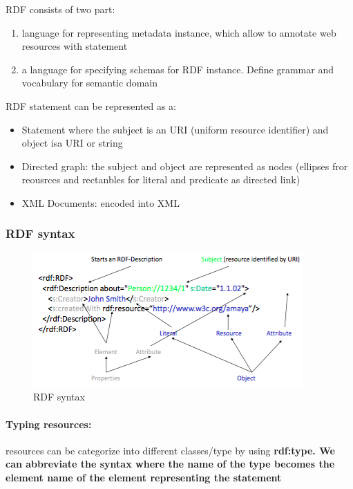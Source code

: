 RDF consists of two part:
\begin{enumerate}
\item language for representing metadata instance, which allow to annotate web resources with statement
\item a language for specifying schemas for RDF instance. Define grammar and vocabulary for semantic domain
\end{enumerate}

RDF statement can be represented as a:
\begin{itemize}
\item Statement where the subject is an URI (uniform resource identifier) and object isa URI or string
\item Directed graph: the subject and object are represented as nodes (ellipses fror reousrces and rectanbles for literal and predicate as directed link)
\item XML Documents: encoded into XML
\end{itemize}

\subsubsection{RDF syntax}
\begin{figure}[H]
\begin{center}
\includegraphics[width=1\linewidth]{figures/rdf.png}
\end{center}
\caption{RDF syntax}
\end{figure}

\paragraph{Typing resources:} resources can be categorize into different classes/type by using \bf{rdf:type}. We can abbreviate the syntax where the name of the type becomes the element name of the element representing the statement

